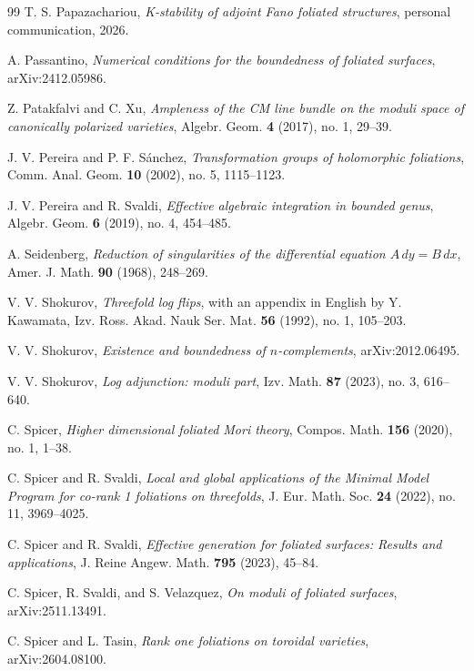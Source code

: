 \documentclass[11pt,reqno]{amsart}
\numberwithin{equation}{section}
\theoremstyle{definition}
\begin{document}
\begin{thebibliography}{99}
 T. S. Papazachariou, \textit{K-stability of adjoint Fano foliated structures}, personal communication, 2026.

 A. Passantino, \textit{Numerical conditions for the boundedness of foliated surfaces}, arXiv:2412.05986.

 Z. Patakfalvi and C. Xu, \textit{Ampleness of the CM line bundle on the moduli space of canonically polarized varieties}, Algebr. Geom. \textbf{4} (2017), no. 1, 29--39.

 J. V. Pereira and P. F. S\'anchez, \textit{Transformation groups of holomorphic foliations}, Comm. Anal. Geom. \textbf{10} (2002), no. 5, 1115--1123.

 J. V. Pereira and R. Svaldi, \textit{Effective algebraic integration in bounded genus}, Algebr. Geom. \textbf{6} (2019), no. 4, 454--485.

 A. Seidenberg, \textit{Reduction of singularities of the differential equation $A\,dy = B\,dx$}, Amer. J. Math. \textbf{90} (1968), 248--269.

 V. V. Shokurov, \textit{Threefold log flips}, with an appendix in English by Y. Kawamata, Izv. Ross. Akad. Nauk Ser. Mat. \textbf{56} (1992), no. 1, 105--203.

 V. V. Shokurov, \textit{Existence and boundedness of $n$-complements}, arXiv:2012.06495.

 V. V. Shokurov, \textit{Log adjunction: moduli part}, Izv. Math. \textbf{87} (2023), no. 3, 616--640.

 C. Spicer, \textit{Higher dimensional foliated Mori theory}, Compos. Math. \textbf{156} (2020), no. 1, 1--38.

 C. Spicer and R. Svaldi, \textit{Local and global applications of the Minimal Model Program for co-rank 1 foliations on threefolds}, J. Eur. Math. Soc. \textbf{24} (2022), no. 11, 3969--4025.

 C. Spicer and R. Svaldi, \textit{Effective generation for foliated surfaces: Results and applications}, J. Reine Angew. Math. \textbf{795} (2023), 45--84.

 C. Spicer, R. Svaldi, and S. Velazquez, \textit{On moduli of foliated surfaces}, arXiv:2511.13491.

 C. Spicer and L. Tasin, \textit{Rank one foliations on toroidal varieties}, arXiv:2604.08100.


\end{thebibliography}
\end{document}
